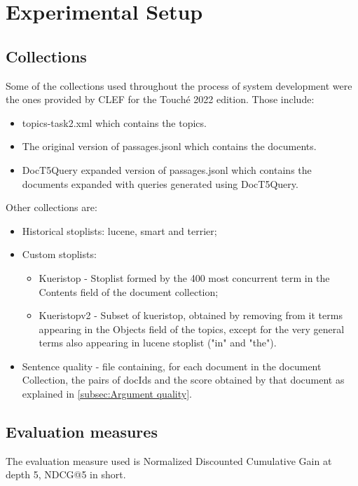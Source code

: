 \section{Experimental Setup}
\label{sec:setup}

\subsection{Collections}

	Some of the collections used throughout the process of system development were the ones provided by CLEF for the Touché 2022 edition. Those include:

	\begin{itemize}
		\item topics-task2.xml which contains the topics.
		\item The original version of passages.jsonl which contains the documents.
		\item DocT5Query expanded version of passages.jsonl which contains the documents expanded with queries generated using DocT5Query.
	\end{itemize}

	Other collections are:
	\begin{itemize}
		\item Historical stoplists: lucene, smart and terrier;
		\item Custom stoplists:
			\begin{itemize}
				\item Kueristop - Stoplist formed by the 400 most concurrent term in the Contents field of the document collection;
				\item Kueristopv2 - Subset of kueristop, obtained by removing from it terms appearing in the Objects field of the topics, except for the very general terms also appearing in lucene stoplist ("in" and "the").
			\end{itemize}
		\item Sentence quality - file containing, for each document in the document Collection, the pairs of docIds and the score obtained by that document as explained in \ref{subsec:Argument quality}.
	\end{itemize}
	

\subsection{Evaluation measures}

	The evaluation measure used is Normalized Discounted Cumulative Gain at depth 5, NDCG@5 in short.

